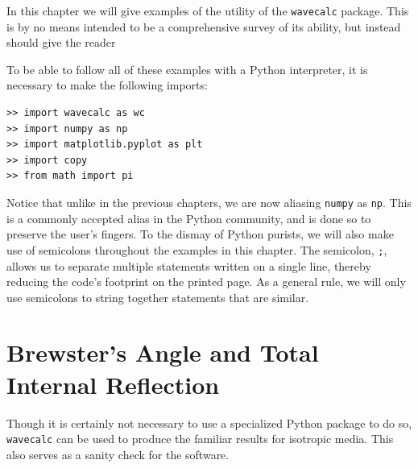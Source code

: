 \documentclass[11pt, reqno]{book}%
\newcounter{ct}
\newcommand{\tw}[1]{{\tt #1}}
\begin{document}
In this chapter we will give examples of the utility of the \tw{wavecalc} package. This is by no means intended to be a comprehensive survey of its ability, but instead should give the reader 

To be able to follow all of these examples with a Python interpreter, it is necessary to make the following imports:
\begin{verbatim}
>> import wavecalc as wc
>> import numpy as np
>> import matplotlib.pyplot as plt
>> import copy
>> from math import pi
\end{verbatim}
\noindent Notice that unlike in the previous chapters, we are now aliasing \tw{numpy} as \tw{np}. This is a commonly accepted alias in the Python community, and is done so to preserve the user's fingers. To the dismay of Python purists, we will also make use of semicolons throughout the examples in this chapter. The semicolon, \tw{;}, allows us to separate multiple statements written on a single line, thereby reducing the code's footprint on the printed page. As a general rule, we will only use semicolons to string together statements that are similar.









\section{Brewster's Angle and Total Internal Reflection}
\label{sec:brewsterandTIR}

Though it is certainly not necessary to use a specialized Python package to do so, \tw{wavecalc} can be used to produce the familiar results for isotropic media. This also serves as a sanity check for the software.
\end{document}
